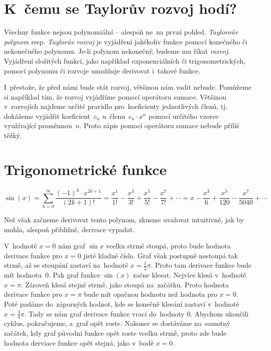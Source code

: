 
\vfill{}
\pagebreak
\section{K~čemu se Taylorův rozvoj hodí?}
\label{sec:taylor-uvod}

Všechny funkce nejsou polynomiální -- alespoň ne~na první pohled. \emph{Tayloroův
polynom} resp. \emph{Taylorův rozvoj} je vyjádření jakékoliv funkce pomocí konečného
či nekonečného polynomu. Je-li polynom nekonečný, budeme mu říkat \emph{rozvoj}.
Vyjádření složitých funkcí, jako například exponenciálních či trigonometrických,
pomocí polynomu či rozvoje umožňuje derivovat i~takové funkce.

I~přestože, že před námi bude stát rozvoj, většinou nám vadit nebude. Pomůžeme si
například tím, že rozvoj vyjádříme pomocí operátoru sumace. Většinou v~rozvojích
najdeme určité pravidlo pro~koeficienty jednotlivých členů, tj. dokážeme vyjádřit
koeficient~$c_n$ u~členu~${c_n \cdot x^n}$ pomocí určitého vzorce využívající
proměnnou~$n$. Proto zápis pomocí operátoru sumace nebude příliš těžký.

\section{Trigonometrické funkce}
\label{sec:taylor-trigonometrie}

\begin{equation*}
    \sin(x)
    = \sum_{k=0}^{\infty} \frac{(-1)^k \cdot x^{2k + 1}}{(2k + 1)!}
    = \frac{x^1}{1!} - \frac{x^3}{3!} + \frac{x^5}{5!} - \frac{x^7}{7!} + \cdots
    = x - \frac{x^3}{6} + \frac{x^5}{120} - \frac{x^7}{5040} + \cdots
\end{equation*}

Než však začneme derivovat tento polynom, zkusme uvažovat intuitivně, jak by mohla, alespoň přibližně, derivace vypadat.

V~hodnotě $x = 0$ nám graf $\sin x$ vcelku strmě stoupá, proto bude hodnota derivace funkce pro $x = 0$ jisté kladné číslo. Graf však postupně nestoupá tak strmě, až se stoupání zastaví na~hodnotě $x = \frac12 \pi$. Proto tam derivace funkce bude mít hodnotu~0. Pak graf funkce $\sin(x)$ začne klesat. Nejvíce klesá v~hodnotě $x = \pi$. Zároveň klesá stejně strmě, jako stoupá na~začátku. Proto hodnota derivace funkce pro $x = \pi$ bude mít opačnou hodnotu než hodnota pro $x = 0$. Poté padáme do~záporných hodnot, kde se konečně klesání zastaví v~hodnotě $x = \frac34 \pi$. Tady se nám graf derivace funkce vrací do~hodnoty 0. Abychom ukončili cyklus, pokračujeme, a~graf opět roste. Nakonec se dostáváme na~samotný začátek, kdy graf původní funkce opět roste vcelku strmě, proto zde bude hodnota derviace funkce opět stejná, jako v~bodě $x = 0$.

